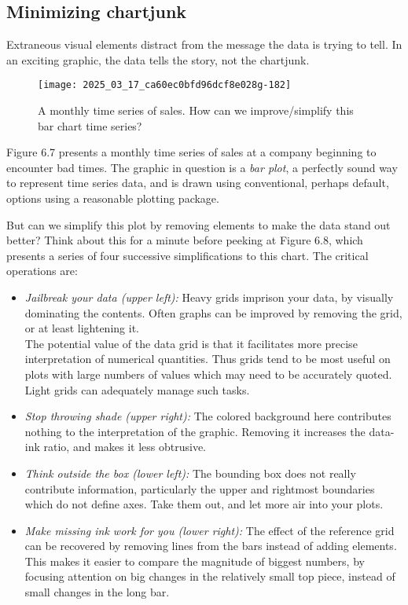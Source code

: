 \documentclass[10pt]{article}
\begin{document}
\subsection{Minimizing chartjunk}
Extraneous visual elements distract from the message the data is trying to tell. In an exciting graphic, the data tells the story, not the chartjunk.

\begin{figure}[h]
    \centering
    \texttt{[image: 2025\_03\_17\_ca60ec0bfd96dcf8e028g-182]}
    \caption{A monthly time series of sales. How can we improve/simplify this bar chart time series?}
\end{figure}

Figure 6.7 presents a monthly time series of sales at a company beginning to encounter bad times. The graphic in question is a \emph{bar plot}, a perfectly sound way to represent time series data, and is drawn using conventional, perhaps default, options using a reasonable plotting package.

But can we simplify this plot by removing elements to make the data stand out better? Think about this for a minute before peeking at Figure 6.8, which presents a series of four successive simplifications to this chart. The critical operations are:

\begin{itemize}
  \item \emph{Jailbreak your data (upper left):} Heavy grids imprison your data, by visually dominating the contents. Often graphs can be improved by removing the grid, or at least lightening it.\\
  The potential value of the data grid is that it facilitates more precise interpretation of numerical quantities. Thus grids tend to be most useful on plots with large numbers of values which may need to be accurately quoted. Light grids can adequately manage such tasks.
  \item \emph{Stop throwing shade (upper right):} The colored background here contributes nothing to the interpretation of the graphic. Removing it increases the data-ink ratio, and makes it less obtrusive.
  \item \emph{Think outside the box (lower left):} The bounding box does not really contribute information, particularly the upper and rightmost boundaries which do not define axes. Take them out, and let more air into your plots.
  \item \emph{Make missing ink work for you (lower right):} The effect of the reference grid can be recovered by removing lines from the bars instead of adding elements. This makes it easier to compare the magnitude of biggest numbers, by focusing attention on big changes in the relatively small top piece, instead of small changes in the long bar.
\end{itemize}
\end{document}
